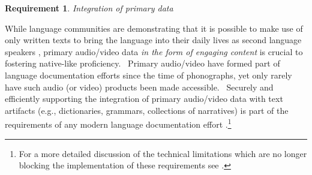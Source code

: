 \documentclass[11pt]{article}
\newcommand{\smalltodo}[2][]
    {\todo[caption={#2}, #1]
    {\tiny#2\normalsize}}
\newtheorem{requirement}{Requirement}
\begin{document}
\begin{requirement}
	\label{req:primary-data}
       Integration of primary data
\end{requirement}


While language communities are demonstrating that it is possible to make use of
only written texts to bring the language into their daily lives as second
language speakers \cite{Ironstrack:2012}, primary audio/video data \emph{in the
form of engaging content} is crucial to fostering native-like proficiency.
~Primary audio/video  have formed part of  language documentation efforts since
the time of phonographs, yet only rarely have such audio (or video) products been
made accessible. %
~Securely and efficiently supporting the integration of primary audio/video data
with text artifacts (e.g., dictionaries, grammars, collections of narratives)
is part of the requirements of any modern language documentation effort
\cite{Schroeter:2006} \cite{Good:2012b}.\footnote{For a more detailed discussion of the technical limitations which are no longer blocking the implementation of these requirements see \cite{lingsync:2012}. } 
 


\end{document}
